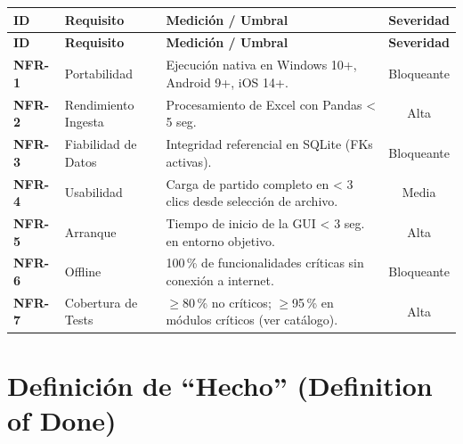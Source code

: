 \documentclass[11pt,a4paper]{article}
\begin{document}
\begin{longtable}{>{\small\bfseries}l >{\small}p{3.8cm} >{\small}p{5.8cm} >{\small}c}
\toprule
\rowcolor{headergray}
\textbf{ID} & \textbf{Requisito} & \textbf{Medición / Umbral} & \textbf{Severidad} \\
\midrule
\endfirsthead
\toprule
\rowcolor{headergray}
\textbf{ID} & \textbf{Requisito} & \textbf{Medición / Umbral} & \textbf{Severidad} \\
\midrule
\endhead
NFR-1 & Portabilidad & Ejecución nativa en Windows 10+, Android 9+, iOS 14+. & Bloqueante \\
\rowcolor{headergray}
NFR-2 & Rendimiento Ingesta & Procesamiento de Excel con Pandas < 5 seg. & Alta \\
NFR-3 & Fiabilidad de Datos & Integridad referencial en SQLite (FKs activas). & Bloqueante \\
\rowcolor{headergray}
NFR-4 & Usabilidad & Carga de partido completo en < 3 clics desde selección de archivo. & Media \\
NFR-5 & Arranque & Tiempo de inicio de la GUI < 3 seg. en entorno objetivo. & Alta \\
\rowcolor{headergray}
NFR-6 & Offline & 100\,\% de funcionalidades críticas sin conexión a internet. & Bloqueante \\
NFR-7 & Cobertura de Tests & $\geq$80\,\% no críticos; $\geq$95\,\% en módulos críticos (ver catálogo). & Alta \\
\bottomrule
\end{longtable}

\section{Definición de ``Hecho'' (Definition of Done)}
\end{document}
